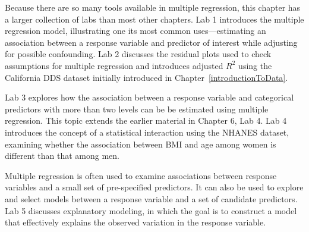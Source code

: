 Because there are so many tools available in multiple regression, this chapter has a larger collection of labs than most other chapters. Lab 1 introduces the multiple regression model, illustrating one its most common uses---estimating an association between a response variable and predictor of interest while adjusting for possible confounding. Lab 2 discusses the residual plots used to check assumptions for multiple regression and introduces adjusted $R^2$ using the California DDS dataset initially introduced in Chapter~\ref{introductionToData}. 

Lab 3 explores how the association between a response variable and categorical predictors with more than two levels can be be estimated using multiple regression. This topic extends the earlier material in Chapter 6, Lab 4. Lab 4 introduces the concept of a statistical interaction using the NHANES dataset, examining whether the association between BMI and age among women is different than that among men. 

Multiple regression is often used to examine associations between response variables and a small set of pre-specified predictors. It can also be used to explore and select models between a response variable and a set of candidate predictors. Lab 5 discusses explanatory modeling, in which the goal is to construct a model that effectively explains the observed variation in the response variable. 
 



